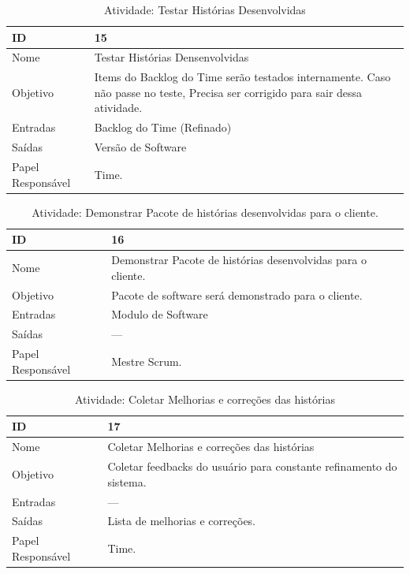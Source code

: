     \begin{table}[H]
      \centering
        \begin{tabular}{| m{5em} | m{10cm} |}
          \hline
          ID       & 15   \\ \hline
          Nome     & Testar Histórias Densenvolvidas  \\ \hline
          Objetivo & Items do Backlog do Time serão testados internamente. Caso não passe no teste, Precisa ser corrigido para sair dessa atividade.  \\ \hline
          Entradas & Backlog do Time (Refinado)\\ \hline
          Saídas   & Versão de Software \\ \hline
          Papel Responsável   & Time. \\ \hline
        \end{tabular}
        \caption{Atividade: Testar Histórias Desenvolvidas}
        \label{tabela:atividade15}
    \end{table}

    \begin{table}[H]
      \centering
        \begin{tabular}{| m{5em} | m{10cm} |}
          \hline
          ID       & 16   \\ \hline
          Nome     & Demonstrar Pacote de histórias desenvolvidas para o cliente. \\ \hline
          Objetivo & Pacote de software será demonstrado para o cliente. \\ \hline
          Entradas & Modulo de Software\\ \hline
          Saídas   &  --- \\ \hline
          Papel Responsável   & Mestre Scrum. \\ \hline
        \end{tabular}
        \caption{Atividade: Demonstrar Pacote de histórias desenvolvidas para o cliente.}
        \label{tabela:atividade16}
    \end{table}

    \begin{table}[H]
      \centering
        \begin{tabular}{| m{5em} | m{10cm} |}
          \hline
          ID       & 17   \\ \hline
          Nome     & Coletar Melhorias e correções das histórias  \\ \hline
          Objetivo & Coletar feedbacks do usuário para constante refinamento do sistema.  \\ \hline
          Entradas & ---\\ \hline
          Saídas   & Lista de melhorias e correções. \\ \hline
          Papel Responsável   & Time. \\ \hline
        \end{tabular}
        \caption{Atividade: Coletar Melhorias e correções das histórias}
        \label{tabela:atividade17}
    \end{table}


